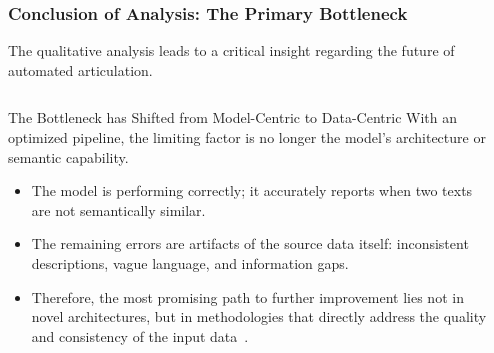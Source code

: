 \documentclass[aspectratio=169,10pt]{beamer}
\begin{document}
\begin{frame}
    \frametitle{Conclusion of Analysis: The Primary Bottleneck}
    
    The qualitative analysis leads to a critical insight regarding the future of automated articulation.
    
    \begin{columns}[T]
        \begin{column}{0.5\textwidth}
            
            \begin{alertblock}{The Bottleneck has Shifted from Model-Centric to Data-Centric}
                With an optimized pipeline, the limiting factor is no longer the model's architecture or semantic capability.
                \begin{itemize}
                    \item The model is performing correctly; it accurately reports when two texts are not semantically similar.
                    \item The remaining errors are artifacts of the source data itself: inconsistent descriptions, vague language, and information gaps.
                    \item Therefore, the most promising path to further improvement lies not in novel architectures, but in methodologies that directly address the quality and consistency of the input data~\cite{gauthier2022}.
                \end{itemize}
            \end{alertblock}
            
        \end{column}
        
        \begin{column}{0.45\textwidth}
            
            

\end{column}
\end{columns}
\end{frame}
\end{document}
